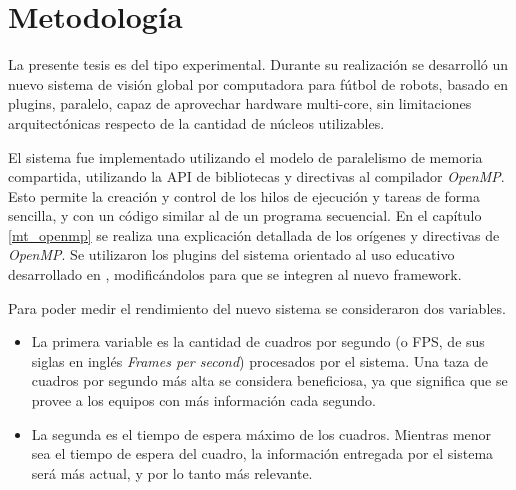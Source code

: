 
\section{Metodología}

\label{metodologia}

La presente tesis es del tipo experimental. Durante su realización se desarrolló
un nuevo sistema de visión global por computadora para fútbol de robots, basado
en plugins, paralelo, capaz de aprovechar hardware multi-core, sin limitaciones
arquitectónicas respecto de la cantidad de núcleos utilizables.

El sistema fue implementado utilizando el modelo de paralelismo de memoria
compartida, utilizando la API de bibliotecas y directivas al compilador
\emph{OpenMP}. Esto permite la creación y control de los hilos de ejecución y
tareas de forma sencilla, y con un código similar al de un programa secuencial.
En el capítulo \ref{mt_openmp} se realiza una explicación detallada de los
orígenes y directivas de \emph{OpenMP}. Se utilizaron los plugins del sistema
orientado al uso educativo desarrollado en \cite{torres2014}, modificándolos
para que se integren al nuevo framework.

Para poder medir el rendimiento del nuevo sistema se consideraron dos variables.

\begin {itemize}

	\item	La primera variable es la cantidad de cuadros por segundo (o
		FPS, de sus siglas en inglés \emph{Frames per second})
		procesados por el sistema. Una taza de cuadros por segundo más
		alta se considera beneficiosa, ya que significa que se provee a
		los equipos con más información cada segundo.

	\item	La segunda es el tiempo de espera máximo de los cuadros.
		Mientras menor sea el tiempo de espera del cuadro, la
		información entregada por el sistema será más actual, y por lo
		tanto más relevante.

\end {itemize}
